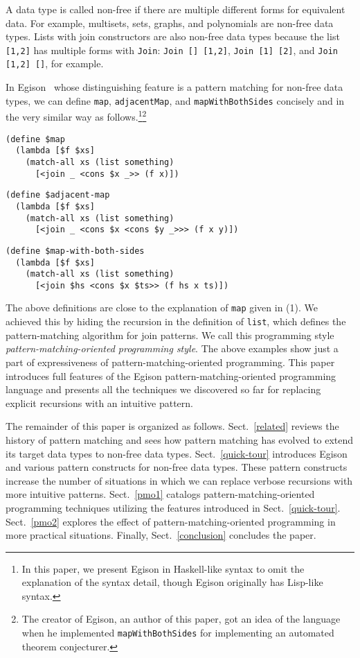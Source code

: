 \documentclass{article}
\begin{document}
A data type is called non-free if there are multiple different forms for equivalent data.
For example, multisets, sets, graphs, and polynomials are non-free data types.
Lists with join constructors are also non-free data types because the list \texttt{[1,2]} has multiple forms with \texttt{Join}: \texttt{Join [] [1,2]}, \texttt{Join [1] [2]}, and \texttt{Join [1,2] []}, for example.

In Egison~\cite{egisonWeb} whose distinguishing feature is a pattern matching for non-free data types, we can define \texttt{map}, \texttt{adjacentMap}, and \texttt{mapWithBothSides} concisely and in the very similar way as follows.\footnote{In this paper, we present Egison in Haskell-like syntax to omit the explanation of the syntax detail, though Egison originally has Lisp-like syntax.}\footnote{The creator of Egison, an author of this paper,  got an idea of the language when he implemented \texttt{mapWithBothSides} for implementing an automated theorem conjecturer.}

\begin{lstlisting}[language=egison]
(define $map
  (lambda [$f $xs]
    (match-all xs (list something)
      [<join _ <cons $x _>> (f x)])
\end{lstlisting}
\begin{lstlisting}[language=egison]
(define $adjacent-map
  (lambda [$f $xs]
    (match-all xs (list something)
      [<join _ <cons $x <cons $y _>>> (f x y)])
\end{lstlisting}
\begin{lstlisting}[language=egison]
(define $map-with-both-sides
  (lambda [$f $xs]
    (match-all xs (list something)
      [<join $hs <cons $x $ts>> (f hs x ts)])
\end{lstlisting}

The above definitions are close to the explanation of \texttt{map} given in (1).
We achieved this by hiding the recursion in the definition of \texttt{list}, which defines the pattern-matching algorithm for join patterns.
We call this programming style \emph{pattern-matching-oriented programming style}.
The above examples show just a part of expressiveness of pattern-matching-oriented programming.
This paper introduces full features of the Egison pattern-matching-oriented programming language and presents all the techniques we discovered so far for replacing explicit recursions with an intuitive pattern.

The remainder of this paper is organized as follows.
Sect.~\ref{related} reviews the history of pattern matching and sees how pattern matching has evolved to extend its target data types to non-free data types.
Sect.~\ref{quick-tour} introduces Egison and various pattern constructs for non-free data types.
These pattern constructs increase the number of situations in which we can replace verbose recursions with more intuitive patterns.
Sect.~\ref{pmo1} catalogs pattern-matching-oriented programming techniques utilizing the features introduced in Sect.~\ref{quick-tour}.
Sect.~\ref{pmo2} explores the effect of pattern-matching-oriented programming in more practical situations.
Finally, Sect.~\ref{conclusion} concludes the paper.
\end{document}
